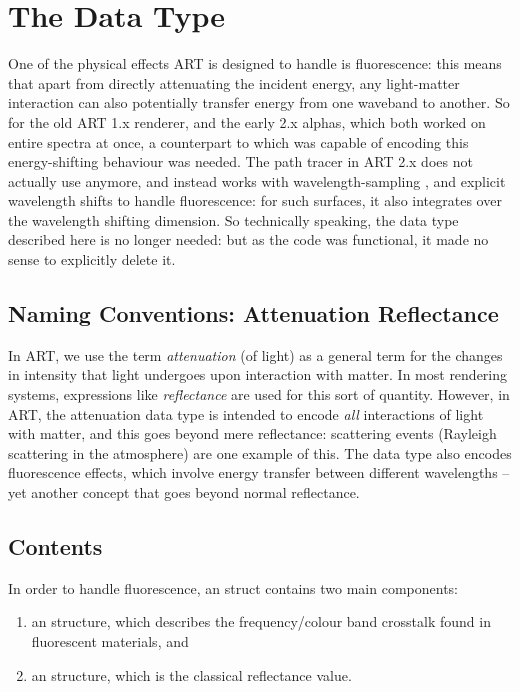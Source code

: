 \section{The  Data Type}

One of the physical effects ART is designed to handle is fluorescence: this means that apart from directly attenuating the incident energy, any light-matter interaction can also potentially transfer energy from one waveband to another. So for the old ART 1.x renderer, and the early 2.x alphas, which both worked on entire spectra at once, a counterpart to  which was capable of encoding this energy-shifting behaviour was needed. The path tracer in ART 2.x does not actually use  anymore, and instead works with wavelength-sampling , and explicit wavelength shifts to handle fluorescence: for such surfaces, it also integrates over the wavelength shifting dimension. So technically speaking, the  data type described here is no longer needed: but as the code was functional, it made no sense to explicitly delete it.

\subsection{Naming Conventions: Attenuation \vs Reflectance}
\label{sect:attenuation}
In ART, we use the term \emph{attenuation} (of light) as a general term for the changes in intensity that light undergoes upon interaction with matter. In most rendering systems, expressions like \emph{reflectance} are used for this sort of quantity. However, in ART, the attenuation data type is intended to encode \emph{all} interactions of light with matter, and this goes beyond mere reflectance: scattering events (\eg Rayleigh scattering in the atmosphere) are one example of this. The  data type also encodes fluorescence effects, which involve energy transfer between different wavelengths -- yet another concept that goes beyond normal reflectance.

\subsection{ Contents}

In order to handle fluorescence, an  struct contains two main components:

\begin{enumerate}
\item an  structure, which describes the frequency/colour band crosstalk found in fluorescent materials, and
\item an  structure, which is the classical reflectance value. 
\end{enumerate}

